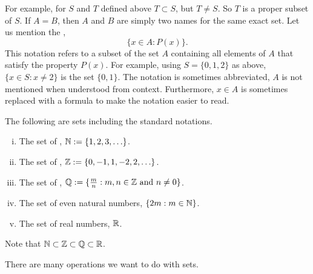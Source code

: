 For example, for $S$ and $T$ defined above $T \subset S$, but
$T \not= S$.  So $T$ is a proper subset of $S$.
If $A = B$, then $A$ and $B$ are simply two names for the
same exact set.
Let us mention the
\emph{},
\begin{equation*}
\bigl\{ x \in A : P(x) \bigr\} .
\end{equation*}
This notation refers to a subset of the set $A$ containing all elements
of $A$ that satisfy the property $P(x)$.
For example, using $S = \{ 0, 1, 2 \}$ as above, $\{ x \in S : x \not= 2 \}$
is the set $\{ 0, 1 \}$.
The notation is sometimes
abbreviated, $A$ is not mentioned when understood from context.
Furthermore, $x \in A$ is sometimes replaced with a formula to make the notation
easier to read.  

\begin{example}
The following are sets including the standard notations.
\begin{enumerate}[(i)]
\item The set of \emph{},
${\mathbb{N}} := \{ 1, 2, 3, \ldots
\}$.
\item The set of \emph{},
${\mathbb{Z}} := \{ 0, -1, 1, -2, 2, \ldots
\}$.
\item The set of \emph{},
${\mathbb{Q}} := \{ \frac{m}{n} :  m, n \in {\mathbb{Z}}
\text{ and } n \not= 0 \}$.
\item The set of even natural numbers, $\{  2m : m \in {\mathbb{N}} \}$.
\item The set of real numbers,
${\mathbb{R}}$.
\end{enumerate}

Note that ${\mathbb{N}} \subset {\mathbb{Z}} \subset {\mathbb{Q}} \subset {\mathbb{R}}$.
\end{example}

There are many operations we want to do with sets.

